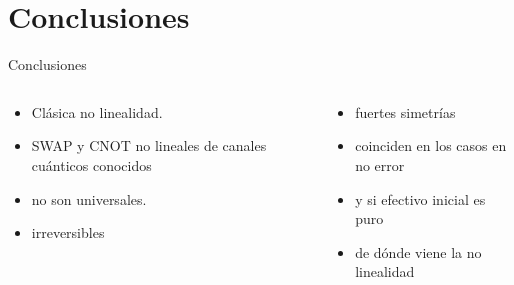 \section{Conclusiones}

\begin{frame}{Conclusiones}
    \begin{columns}
        \begin{column}{0.5\textwidth}
            \begin{itemize}
                \item Clásica no linealidad.
                \item SWAP y CNOT no lineales de canales cuánticos conocidos
                \item no son universales.
                \item irreversibles
            \end{itemize}
        \end{column}
        \begin{column}{0.5\textwidth}
            \begin{itemize}
                \item fuertes simetrías
                \item coinciden en los casos en no error
                \item y si efectivo inicial es puro
                \item de dónde viene la no linealidad
            \end{itemize}
        \end{column}
    \end{columns}
\end{frame}
